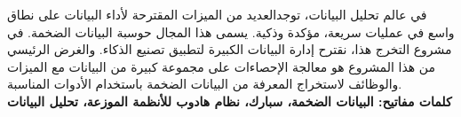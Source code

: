 \begin{spacing}{1.3}
\begin{arabtext}

في عالم تحليل البيانات، توجدالعديد من الميزات المقترحة لأداء البيانات على نطاق واسع في عمليات سريعة، مؤكدة وذكية. يسمى هذا المجال حوسبة البيانات الضخمة. في مشروع التخرج هذا، نقترح إدارة البيانات الكبيرة لتطبيق تصنيع الذكاء. والغرض الرئيسي من هذا المشروع هو معالجة الإحصاءات على مجموعة كبيرة من البيانات مع الميزات والوظائف لاستخراج المعرفة من البيانات الضخمة باستخدام الأدوات المناسبة.\\
\textbf{كلمات مفاتيح: البيانات الضخمة، سبارك، نظام هادوب للأنظمة الموزعة، تحليل البيانات}
\end{arabtext}
\end{spacing}




\vspace{\fill}